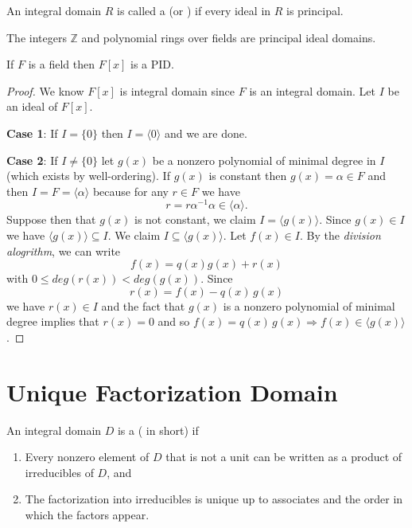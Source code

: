 \begin{definition}
    An integral domain $R$ is called a  (or ) if every ideal in $R$ is principal.
\end{definition}

\begin{example}
    The integers $\mathbb{Z}$ and polynomial rings over fields are principal ideal domains.
\end{example}

\begin{theorem}
    If $F$ is a field then $F[x]$ is a PID.
\end{theorem}
\begin{proof}
    We know $F[x]$ is integral domain since $F$ is an integral domain. Let $I$ be an ideal of 
    $F[x]$.

    \textbf{Case 1}: If $I = \{ 0 \}$ then $I = \langle 0 \rangle$ and we are done.

    \textbf{Case 2}: If $I \neq \{ 0 \}$ let $g(x)$ be a nonzero polynomial of minimal degree in 
    $I$ (which exists by well-ordering). If $g(x)$ is constant then $g(x) = \alpha \in F$ and then 
    $I = F = \langle \alpha \rangle$ because for any $r \in F$ we have 
    \[
        r = r\alpha^{-1} \alpha \in \langle \alpha \rangle.
    \]
    Suppose then that $g(x)$ is not constant, we claim $I = \langle g(x) \rangle$. Since 
    $g(x) \in I$ we have $\langle g(x) \rangle \subseteq I$. We claim $I \subseteq \langle g(x) \rangle$. 
    Let $f(x) \in I$. By the \textit{division alogrithm}, we can write 
    \[
        f(x) = q(x)g(x) + r(x)
    \]
    with $0 \leq deg(r(x)) < deg(g(x))$. Since 
    \[
        r(x) = f(x) - q(x)\, g(x)
    \]
    we have $r(x) \in I$ and the fact that $g(x)$ is a nonzero polynomial of minimal degree implies 
    that $r(x) = 0$ and so $f(x) = q(x)\, g(x) \Longrightarrow  f(x) \in \langle g(x) \rangle$.
\end{proof}

\section{Unique Factorization Domain}

\begin{definition}
    An integral domain $D$ is a  ( in short) 
    if 
    \begin{enumerate}
        \item Every nonzero element of $D$ that is not a unit can be written as a product of 
        irreducibles of $D$, and
        \item The factorization into irreducibles is unique up to associates and the order in which 
        the factors appear. 
    \end{enumerate}
\end{definition}

